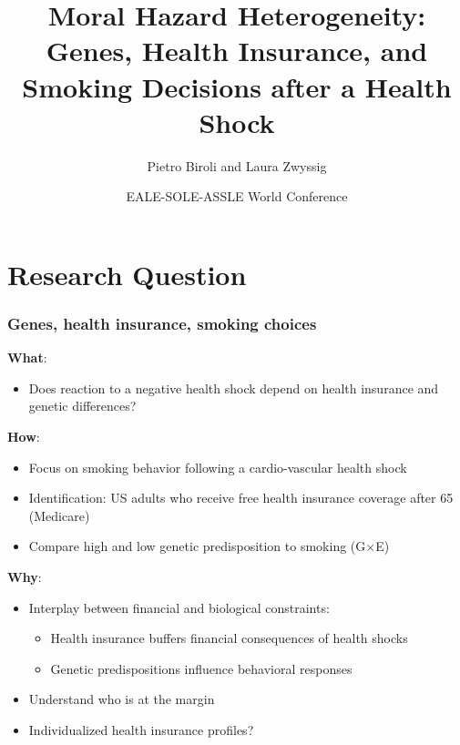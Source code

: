 \documentclass[10pt,compress,xcolor=dvipsnames]{beamer}    %
\title[GxInsurance]{\textbf{Moral Hazard Heterogeneity: Genes, Health Insurance, and Smoking Decisions after a Health Shock}}
\author[Pietro, Laura]{Pietro Biroli and Laura Zwyssig}
\institute[UZH]{University of Z\"urich}
\date{\color{red} EALE-SOLE-ASSLE World Conference \\ \color{blue}{June 25, 2020}}
\newcounter{ex}
\newcommand{\1}[1]{\mathrm{1\hspace*{-2.5pt}l}[#1]}	%
\begin{document}
\maketitle

\section{Research Question}
\begin{frame}
\frametitle{Genes, health insurance, smoking choices}

\textbf{What}:
	\begin{itemize}
		\item Does reaction to a negative health shock depend on health insurance and genetic differences?
	\end{itemize}

  \vspace{2ex}

\textbf{How}:
\begin{itemize}
  \item Focus on smoking behavior following a cardio-vascular health shock
  \item Identification: US adults who receive free health insurance coverage after 65 (Medicare)
  \item Compare high and low genetic predisposition to smoking (G$\times$E)
\end{itemize}

  \vspace{2ex}

\textbf{Why}:
\begin{itemize}
		\item Interplay between financial and biological constraints:
		\begin{itemize}
			\item Health insurance buffers financial consequences of health shocks
			\item Genetic predispositions influence behavioral responses
		\end{itemize}
			\item Understand who is at the margin
		\item Individualized health insurance profiles?
\end{itemize}
\end{frame}
\end{document}
